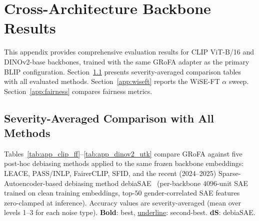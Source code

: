 \section{Cross-Architecture Backbone Results}
\label{app:xback}

This appendix provides comprehensive evaluation results for CLIP ViT-B/16 and DINOv2-base backbones, trained with the same GRoFA adapter as the primary BLIP configuration.
Section~\ref{app:sev_avg} presents severity-averaged comparison tables with all evaluated methods.
Section~\ref{app:wiseft} reports the WiSE-FT $\alpha$ sweep.
Section~\ref{app:fairness} compares fairness metrics.

\subsection{Severity-Averaged Comparison with All Methods}
\label{app:sev_avg}

Tables~\ref{tab:app_clip_ff}--\ref{tab:app_dinov2_utk} compare GRoFA against five post-hoc debiasing methods applied to the same frozen backbone embeddings: LEACE, PASS/INLP, FairerCLIP, SFID, and the recent (2024--2025) Sparse-Autoencoder-based debiasing method debiaSAE~\cite{sasse2024debiasae} (per-backbone $4096$-unit SAE trained on clean training embeddings, top-$50$ gender-correlated SAE features zero-clamped at inference).
Accuracy values are severity-averaged (mean over levels 1--3 for each noise type).
\textbf{Bold}: best, \underline{underline}: second-best. \textbf{dS}: debiaSAE.


